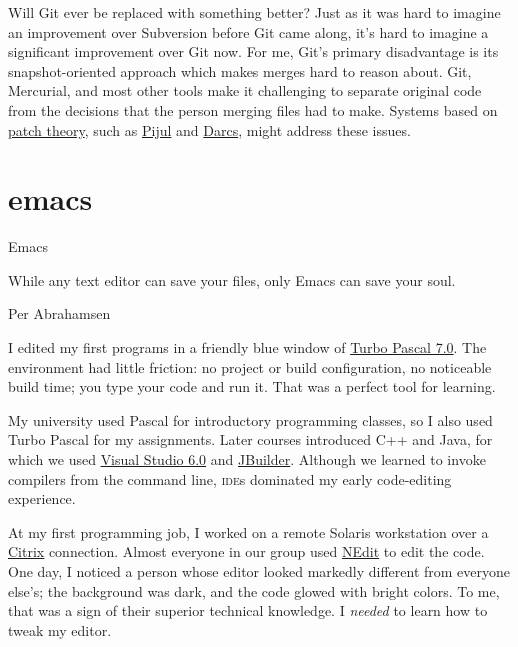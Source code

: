 \documentclass{article}
\begin{document}
Will Git ever be replaced with something better?
Just as it was hard to imagine an improvement over Subversion before Git came along, it's hard to imagine a significant improvement over Git now.
For me, Git's primary disadvantage is its snapshot-oriented approach which makes merges hard to reason about.
Git, Mercurial, and most other tools make it challenging to separate original code from the decisions that the person merging files had to make.
Systems based on \href{https://en.m.wikibooks.org/wiki/Understanding_Darcs/Patch_theory}{patch theory}, such as \href{https://pijul.org/}{Pijul} and \href{https://darcs.net/}{Darcs}, might address these issues.

\section{emacs}{Emacs}

\epigraph{
  While any text editor can save your files, only Emacs can save your soul.
}{Per Abrahamsen}

I edited my first programs in a friendly blue window of \href{https://en.wikipedia.org/wiki/Turbo_Pascal}{Turbo Pascal 7.0}.
The environment had little friction: no project or build configuration, no noticeable build time; you type your code and run it.
That was a perfect tool for learning.

My university used Pascal for introductory programming classes, so I also used Turbo Pascal for my assignments.
Later courses introduced C++ and Java, for which we used \href{https://en.wikipedia.org/wiki/Visual_Studio#6.0_(1998)}{Visual Studio 6.0} and \href{https://en.wikipedia.org/wiki/JBuilder}{JBuilder}.
Although we learned to invoke compilers from the command line, \textsc{ide}s dominated my early code-editing experience.

At my first programming job, I worked on a remote Solaris workstation over a \href{https://en.wikipedia.org/wiki/Citrix_Systems}{Citrix} connection.
Almost everyone in our group used \href{https://en.wikipedia.org/wiki/NEdit}{NEdit} to edit the code.
One day, I noticed a person whose editor looked markedly different from everyone else's; the background was dark, and the code glowed with bright colors.
To me, that was a sign of their superior technical knowledge.
I \emph{needed} to learn how to tweak my editor.
\end{document}
